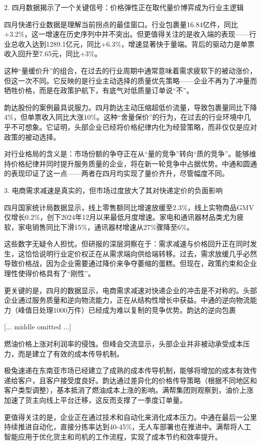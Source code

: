 \documentclass[11pt]{ctexart}
\begin{document}
2. 四月数据揭示了一个关键信号：价格弹性正在取代量价博弈成为行业主逻辑

四月快递行业数据是理解当前拐点的最佳窗口。行业包裹量16.84亿件，同比+3.2\%，这一增速在历史序列中并不突出。但更值得关注的是收入端的表现——行业总收入达到1289.1亿元，同比+6.3\%，增速显著快于量端。背后的驱动力是单票收入回升至7.65元，同比+3\%。

这种“量缓价升”的组合，在过去的行业周期中通常意味着需求疲软下的被动涨价，但这一次不同。它反映的是行业主动选择的质量优先策略——企业不再为了冲量而牺牲价格，而是在政策护航下，有底气对低质量订单说“不”。

韵达股份的案例最具说服力。四月韵达主动压缩超低价流量，导致包裹量同比下降4\%，但单票收入同比大涨10\%。这种“舍量保价”的行为，在过去的行业环境中几乎不可想象。它证明，头部企业已经将价格纪律内化为经营策略，而非仅仅是应对政策的被动选择。

对行业格局的含义是：市场份额的争夺正在从“量的竞争”转向“质的竞争”。能够维持价格纪律并同时提升服务质量的企业，将在新一轮竞争中占据优势。中通和圆通的表现印证了这一点——两者在四月均实现了量价齐升，尽管幅度不同。

3. 电商需求减速是真实的，但市场过度放大了其对快递定价的负面影响

四月国家统计局数据显示，线上零售额同比增速放缓至2.3\%，线上实物商品GMV仅增长0.2\%，创下2024年12月以来最低月度增速。家电和通讯器材品类尤为疲软，家电销售同比下滑15\%，通讯器材增速从27\%骤降至6\%。

这些数字无疑令人担忧。但研报的深层洞察在于：需求减速与价格回升正在同时发生，这恰恰说明行业定价权正在从需求端向供给端转移。过去，需求放缓几乎必然导致价格战，因为企业需要通过降价来争夺萎缩的蛋糕。但现在，政策约束和企业理性使得价格具有了“刚性”。

更关键的是，四月的数据显示，电商需求减速对快递企业的冲击是不对称的。头部企业通过服务质量和逆向物流能力，正在从结构性增长中获益。中通的逆向物流能力（峰值日处理1000万件）已经成为难以复制的竞争优势。韵达的逆向包裹

[... middle omitted ...]

燃油价格上涨对利润率的侵蚀。但峰会交流显示，头部企业并非被动承受成本压力，而是建立了有效的成本传导机制。

极兔速递在东南亚市场已经建立了成熟的成本传导机制，能够将增加的成本有效传递给客户，且客户接受度良好。韵达通过差异化的价格传导策略（根据不同地区和客户类型调整），基本抵消了燃油成本上涨的影响。满帮集团则观察到，油价上涨加速了货主向线上平台迁移，这反而支撑了一季度订单量。

更值得关注的是，企业正在通过技术和自动化来消化成本压力。中通在最后一公里持续推进自动化，直接分拣率达到40-45\%，无人车部署也在推进中。满帮将人工智能应用于优化货主和司机的工作流程，实现了成本节约和效率提升。
\end{document}
